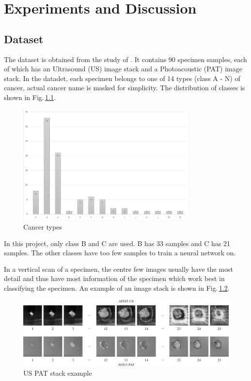 \chapter{Experiments and Discussion} 

\section{Dataset}
The dataset is obtained from the study of \cite{Kosik2019}. It contains 90 specimen samples, each of which has an Ultrasound (US) image stack and a Photoacoustic (PAT) image stack. In the datadet, each specimen belongs to one of 14 types (class A - N) of cancer, actual cancer name is masked for simplicity. The distribution of classes is shown in Fig.\,\ref{class_graph}.  
\begin{figure}[h]
	\centering
	\includegraphics[width=0.8\textwidth]{Figs/class_graph.png}
    \caption{Cancer types}
    \label{class_graph}
\end{figure}
In this project, only class B and C are used. B has 33 samples and C has 21 samples. The other classes have too few samples to train a neural network on. 

In a vertical scan of a specimen, the centre few images usually have the most detail and thus have most information of the specimen which work best in classifying the specimen. An example of an image stack is shown in Fig.\,\ref{stack}. 

\begin{figure}[h]
	\centering
	\includegraphics[width=\textwidth]{Figs/stack.jpg}
    \caption{US PAT stack example}
    \label{stack}
\end{figure}

